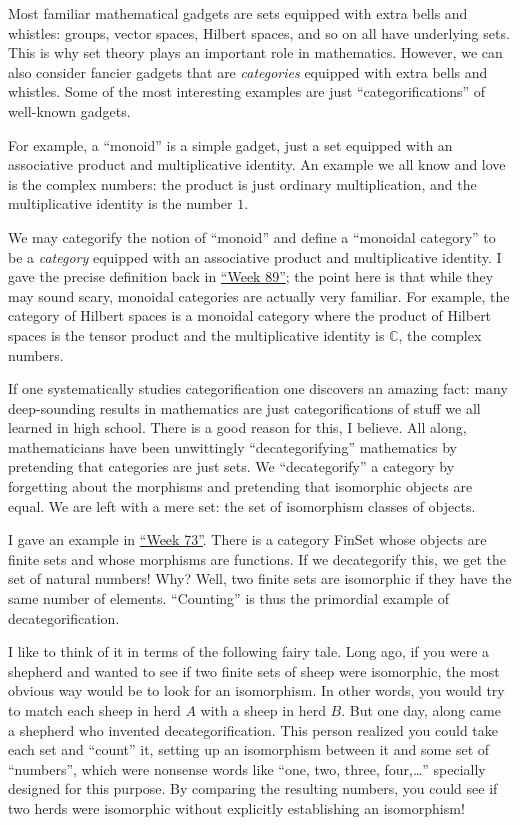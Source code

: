 \documentclass{article}
\begin{document}
Most familiar mathematical gadgets are sets equipped with extra bells
and whistles: groups, vector spaces, Hilbert spaces, and so on all have
underlying sets. This is why set theory plays an important role in
mathematics. However, we can also consider fancier gadgets that are
\emph{categories} equipped with extra bells and whistles. Some of the
most interesting examples are just ``categorifications'' of well-known
gadgets.

For example, a ``monoid'' is a simple gadget, just a set equipped with
an associative product and multiplicative identity. An example we all
know and love is the complex numbers: the product is just ordinary
multiplication, and the multiplicative identity is the number \(1\).

We may categorify the notion of ``monoid'' and define a ``monoidal
category'' to be a \emph{category} equipped with an associative product
and multiplicative identity. I gave the precise definition back in
\protect\hyperlink{week89}{``Week 89''}; the point here is that while
they may sound scary, monoidal categories are actually very familiar.
For example, the category of Hilbert spaces is a monoidal category where
the product of Hilbert spaces is the tensor product and the
multiplicative identity is \(\mathbb{C}\), the complex numbers.

If one systematically studies categorification one discovers an amazing
fact: many deep-sounding results in mathematics are just
categorifications of stuff we all learned in high school. There is a
good reason for this, I believe. All along, mathematicians have been
unwittingly ``decategorifying'' mathematics by pretending that
categories are just sets. We ``decategorify'' a category by forgetting
about the morphisms and pretending that isomorphic objects are equal. We
are left with a mere set: the set of isomorphism classes of objects.

I gave an example in \protect\hyperlink{week73}{``Week 73''}. There is a
category FinSet whose objects are finite sets and whose morphisms are
functions. If we decategorify this, we get the set of natural numbers!
Why? Well, two finite sets are isomorphic if they have the same number
of elements. ``Counting'' is thus the primordial example of
decategorification.

I like to think of it in terms of the following fairy tale. Long ago, if
you were a shepherd and wanted to see if two finite sets of sheep were
isomorphic, the most obvious way would be to look for an isomorphism. In
other words, you would try to match each sheep in herd \(A\) with a
sheep in herd \(B\). But one day, along came a shepherd who invented
decategorification. This person realized you could take each set and
``count'' it, setting up an isomorphism between it and some set of
``numbers'', which were nonsense words like ``one, two, three,
four,\ldots{}'' specially designed for this purpose. By comparing the
resulting numbers, you could see if two herds were isomorphic without
explicitly establishing an isomorphism!
\end{document}
